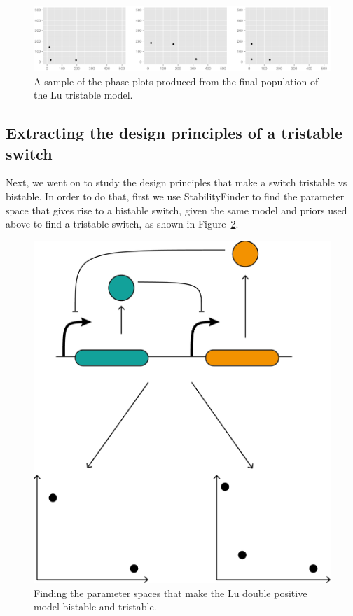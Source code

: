 \begin{figure}[h]
\centering
\includegraphics[scale=0.3]{chapterModelling/Lu_switches/images/double_pos/phase_plots.png}
\caption{A sample of the phase plots produced from the final population of the Lu tristable model.}
\label{fig:lu_tri_phase_pl}
\end{figure}
\clearpage
\subsection{Extracting the design principles of a tristable switch}
Next, we went on to study the design principles that make a switch tristable vs bistable. In order to do that, first we use StabilityFinder to find the parameter space that gives rise to a bistable switch, given the same model and priors used above to find a tristable switch, as shown in Figure~\ref{fig:lu_bi_tri_cartoon}.

\begin{figure}[h]
\centering
\includegraphics[scale=0.5]{chapterModelling/Lu_switches/images/double_pos/lu_bi_tri_cartoon.png}
\caption{Finding the parameter spaces that make the Lu double positive model bistable and tristable. }
\label{fig:lu_bi_tri_cartoon}
\end{figure}

